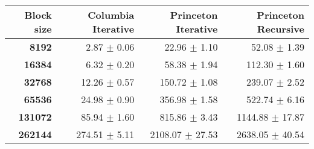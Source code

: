 \begin{tabular}{rrrr}\toprule
\textbf{Block size}  & \textbf{Columbia Iterative} & \textbf{Princeton Iterative} & \textbf{Princeton Recursive}\\\midrule
\textbf{8192}  & 2.87 $\pm$ 0.06 & 22.96 $\pm$ 1.10 & 52.08 $\pm$ 1.39\\
\textbf{16384}  & 6.32 $\pm$ 0.20 & 58.38 $\pm$ 1.94 & 112.30 $\pm$ 1.60\\
\textbf{32768}  & 12.26 $\pm$ 0.57 & 150.72 $\pm$ 1.08 & 239.07 $\pm$ 2.52\\
\textbf{65536}  & 24.98 $\pm$ 0.90 & 356.98 $\pm$ 1.58 & 522.74 $\pm$ 6.16\\
\textbf{131072}  & 85.94 $\pm$ 1.60 & 815.86 $\pm$ 3.43 & 1144.88 $\pm$ 17.87\\
\textbf{262144} & 274.51 $\pm$ 5.11 & 2108.07 $\pm$ 27.53 & 2638.05 $\pm$ 40.54\\
\bottomrule
\end{tabular}
